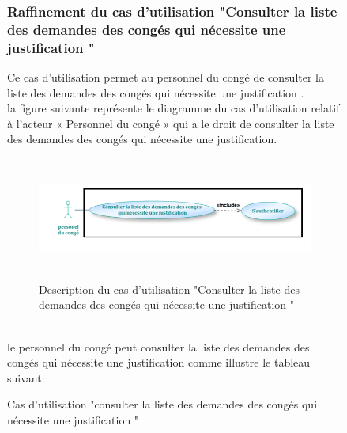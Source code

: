\documentclass[12 pt]{report}
\begin{document}
\begin{figure}[h]
\begin{center}
\subsubsection{Raffinement du cas d'utilisation "Consulter la liste des demandes des congés qui nécessite une justification "}
Ce cas d'utilisation permet au personnel du congé de consulter la liste des demandes des congés qui nécessite une justification .\\
la figure suivante représente le diagramme du cas d’utilisation  relatif à l’acteur « Personnel du congé » qui a le droit de consulter la liste des demandes des congés qui nécessite une justification.
\begin{figure}[h]
\begin{center}
\includegraphics[width= 13cm , height = 4cm]{cas_con_justififie.PNG}
\caption{Description du cas d'utilisation "Consulter la liste des demandes des congés qui nécessite une justification "}
\end{center}
\end{figure}\\
le personnel du congé peut consulter la liste des demandes des congés qui nécessite une justification  comme illustre le tableau suivant:
\begin{table}[htbp]
\begin{center}
\caption{ Cas d'utilisation "consulter la liste des demandes des congés qui nécessite une justification   "}
 

\end{center}
\end{table}
\end{center}
\end{figure}
\end{document}

